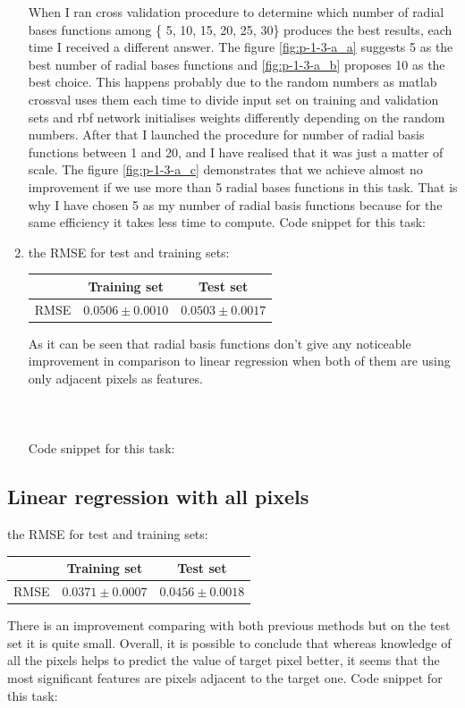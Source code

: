 \documentclass{article}
\begin{document}
\begin{enumerate}[label=(\alph*)]
\begin{figure}[t]
				 	\end{figure}	
				 	When I ran cross validation procedure to determine which number of radial bases functions among \{ 5, 10, 15, 20, 25, 30\} produces the best results, each time I received a different answer.  The figure \ref{fig:p-1-3-a_a} suggests 5 as the best number of radial bases functions and \ref{fig:p-1-3-a_b} proposes 10 as the best choice. This happens probably due to the random numbers as matlab crossval uses them each time to divide input set on training and validation sets and rbf network initialises weights differently depending on the random numbers. After that I launched the procedure for number of radial basis functions between 1 and 20, and I have realised that it was just a matter of scale. The figure \ref{fig:p-1-3-a_c} demonstrates that we achieve almost no improvement if we use more than 5 radial bases functions in this task. That is why I have chosen 5 as my number of radial basis functions because for the same efficiency it takes less time to compute.
				 	Code snippet for this task:
				 	
				 \item
					the RMSE for test and training sets:
					\begin{center}
						\begin{tabular}{| c | c | c |}
							\hline
							\, & Training set & Test set \\ \hline
							RMSE  & $0.0506 \pm 0.0010$ & $0.0503 \pm 0.0017$ \\ 
							\hline
						\end{tabular}
					\end{center}
					As it can be seen that radial basis functions don't give any noticeable improvement in comparison to linear regression when both of them are using only adjacent pixels as features.\\ \\ \\ \\
				 	Code snippet for this task:
				 	
			\end{enumerate}
			 
		\subsection{Linear regression with all pixels}
			the RMSE for test and training sets:
			\begin{center}
				\begin{tabular}{| c | c | c |}
					\hline
					\, & Training set & Test set \\ \hline
					RMSE  &  $0.0371 \pm 0.0007$ & $0.0456 \pm 0.0018$ \\ 
					\hline
				\end{tabular}
			\end{center}
			There is an improvement comparing with both previous methods but on the test set it is quite small. Overall, it is possible to conclude that whereas knowledge of all the pixels helps to predict the value of target pixel better, it seems that the most significant features are pixels adjacent to the target one.
			Code snippet for this task:
			
\end{document}
